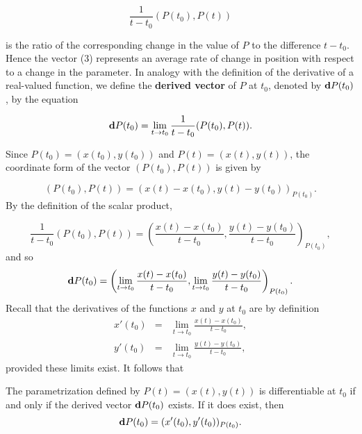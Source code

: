 \begin{equation}
\frac{1}{t - t_0} (P(t_0), P(t))  
\label{eq10.4.3}
\end{equation}



\noindent is the ratio of the corresponding change in the value of $P$ to the difference $t - t_0$. Hence the vector (3) represents an average rate of change in position with respect to a change in the parameter. In analogy with the definition of the derivative of a real-valued function, we define the \textbf{derived vector} of $P$ at $t_0$, denoted by $\mbox{\bf{d}}P(t_0)$, by the equation


$$
\mbox{\bf{d}}P(t_0)= \lim_{t \rightarrow t_0} \frac{1}{t - t_0} (P(t_0),P(t)). 
$$

Since $P(t_0) = (x(t_0), y(t_0))$ and $P(t) = (x(t), y(t))$, the coordinate form of the vector $(P(t_0), P(t))$ is given by

$$
(P(t_0), P(t)) = (x(t) - x(t_0), y(t) - y(t_0))_{P(t_0)}.
$$
By the definition of the scalar product,

$$
\frac{1}{t - t_0} (P(t_0), P(t)) = \left( \frac{x(t) - x(t_0)}{t - t_0}, \frac{y(t) - y(t_0)}{t - t_0} \right)_{P(t_0)} ,
$$
and so
$$
\mbox{\bf{d}}P(t_0) = \left( \lim_{t \rightarrow t_0} \frac{x(t) - x(t_0)}{t - t_0}, \lim_{t \rightarrow t_0} \frac{y(t) - y(t_0)}{t - t_0} \right)_{P(t_0)} .
$$
Recall that the derivatives of the functions $x$ and $y$ at $t_0$ are by definition
\begin{eqnarray*}
x'(t_0) &=& \lim_{t \rightarrow t_0} \frac{x(t) - x(t_0)}{t - t_0}, \\
y'(t_0) &=& \lim_{t \rightarrow t_0} \frac{y(t) - y(t_0)}{t - t_0}, 
\end{eqnarray*}
provided these limits exist. It follows that

\begin{theorem} The parametrization defined by $P(t) = (x(t), y(t) )$ is differentiable at $t_0$ if and only if the derived vector $\mbox{\bf{d}}P(t_0)$ exists. If it does exist, then
$$
\mbox{\bf{d}}P(t_0) = (x'(t_0), y'(t_0))_{P(t_0)} .
$$
\end{theorem}


